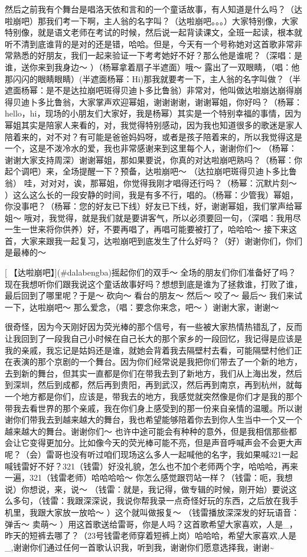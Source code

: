 \documentclass[
]{book}
\begin{document}
然后之前我有个舞台是唱洛天依和言和的一个童话故事，有人知道是什么吗？（达啦崩吧）那我们考一下啊，主人翁的名字叫？（达啦崩吧。。。）大家特别像，大家特别像，就是语文老师在考试的时候，然后说一起背读课文，全班一起读，根本就听不清到底谁背的是对的还是错，哈哈。但是，今天有一个号称她对这首歌非常非常熟悉的好朋友，我们一起来验证一下考考她好不好？那么他是谁呢？（深唱：是谁，送你来到我身边～ ）（杨幂拿着扇子半遮面）哦～ 露出了一双眼睛，（唱：他那闪闪的眼睛眼睛）(半遮面杨幂：Hi)那我就要考一下，主人翁的名字叫做？（半遮面杨幂：是不是达拉崩吧斑得贝迪卜多比鲁翁）非常对，他叫做达啦崩达崩得崩得贝迪卜多比鲁翁，大家掌声欢迎幂姐，谢谢谢谢，谢谢幂姐，你好吗？（杨幂：hello，hi，现场的小朋友们大家好，我是杨幂）其实是一个特别幸福的事情，因为幂姐其实是陪家人来看的，对，我觉得特别感动，因为我也知道很多的歌迷是家人陪着来的，对不对？有可能是爸爸妈妈呀，或者是孩子陪着来的，所以我觉得这是一个，这是不泼冷水的爱，我也非常感谢来到这里每个人，谢谢你们～ （杨幂：谢谢大家支持周深）谢谢幂姐，那如果要说，你真的对达啦崩吧熟吗？（杨幂：你起个调吧）来，全场提醒一下？预备，达啦崩吧～ （达拉崩吧斑得贝迪卜多比鲁翁） 哇，对对对，诶，那幂姐，你觉得我刚才唱得还行吗？（杨幂：沉默片刻～ ）这么这么长的一段安静的时间，我是有多不行，唱的。（杨幂：少管我）幂姐，你没事吧？（杨幂：您的好友已下线）好友已下线，好，谢谢幂姐，我们掌声给幂姐～ 哦对，我觉得，就是我们就是要讲客气，所以必须要回一句，（深唱：我用尽一生一世来将你供养）好，不要再唱了，再唱可能要被打了，哈哈哈～ 接下来这首，大家来跟我一起复习，达啦崩吧到底发生了什么好吗？（好）谢谢你们，你们是最棒的～

[🎵【达啦崩吧】](#dalabengba)摇起你们的双手～ 全场的朋友们你们准备好了吗？现在我想听你们跟我说这个童话故事好吗？想想到底是谁为了拯救谁，打败了谁，最后回到了哪里呢？于是～ 砍向～ 看台的朋友～ 然后～ 咬了～ 最后～ 我们来试一下，达啦崩吧～ 那么爱念，（唱：要念你来念，吧～ ）谢谢大家，谢谢～

很奇怪，因为今天刚好因为荧光棒的那个信号，有一些被大家热情热错乱了，反而让我回到了一段我自己小时候在自己长大的那个家乡的一段回忆，我记得是应该是我的亲戚，我忘记是姑妈还是谁，就她会背着我去隔壁村去看，可能隔壁村他们正在表演的那个京剧的一个舞台。因为你们经常说是我把你们带去了一个新的地方，去到新的舞台，但其实一直都是你们在带我去到了新地方，我们从上海出发，然后到深圳，然后到成都，然后再到贵阳，再到武汉，然后再到南京，再到杭州，就每一个地方都是你们，应该是，带我去的地方，我感觉就突然像是你们才是我的那个带我去看世界的那个亲戚，我在你们身上感受到的那一份来自亲情的温暖。所以谢谢你们带我去到越来越大的舞台，我也希望能够陪着你去到你人生当中一个又一个越来越大的舞台。谢谢你们～ 也许中途可能会有种种的意外，但是我相信那些都会让它变得更加分。比如像今天的荧光棒可能不亮，但是声音呼喊声会不会更大声呢？（会）雷哥也没有听过咱们现场这么多人一起喊他的名字，我如果喊321一起喊钱雷好不好？321（钱雷）好没礼貌，怎么也不加个老师两个字，哈哈哈，再来一遍，321（钱雷老师）哈哈哈哈～ 你怎么感觉跟罚站一样？（钱雷：呃，我想说）你想说，来，说～ （钱雷：就是，我记得，做专辑的时候，刚开始）要说这么多句，（钱雷：我跟深深说，我说你帮我录一点奇怪好玩的东西，之后放在我手机里，我跟大家放一放哈～ ）这个就叫做报复～ （钱雷播放深深发的好玩语音：弹舌～ 卖萌～ ）用这首歌送给雷哥，你是人吗？这首歌希望大家喜欢，人是\_，昨天的短裤去哪了？（23号钱雷老师穿着短裤上岗）哈哈哈，希望大家喜欢,人是\_,谢谢你们通过任何一首歌认识我，听到我，谢谢你们愿意选择我，谢谢\textasciitilde{}
\end{document}
